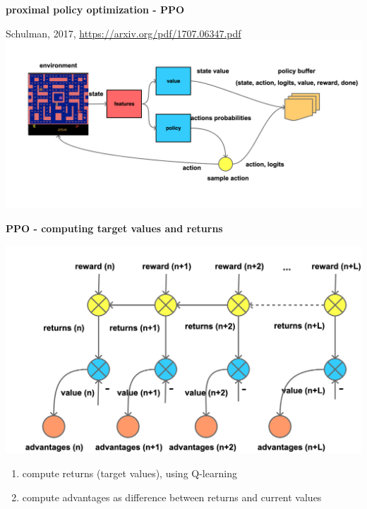 \documentclass[xcolor=dvipsnames]{beamer}
\begin{document}
\begin{frame}{\bf proximal policy optimization - PPO}

Schulman, 2017, \url{https://arxiv.org/pdf/1707.06347.pdf} \\

\centering
\includegraphics[scale=0.12]{../diagrams/basic/ppo.png}

\end{frame}


\begin{frame}{\bf PPO - computing target values and returns}

  \centering
  \includegraphics[scale=0.12]{../diagrams/basic/pporeturns.png}

  \begin{enumerate}
    \item compute returns (target values), using Q-learning
    \item compute advantages as difference between returns and current values
  \end{enumerate}

\end{frame}
\end{document}

